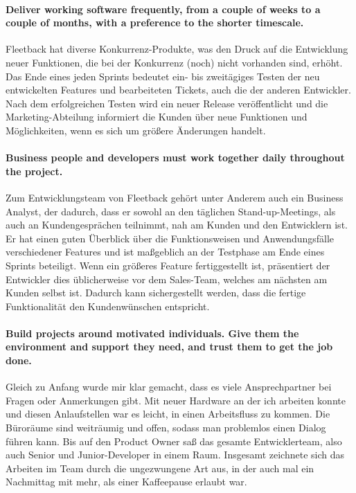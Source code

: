 \documentclass[ngerman]{scrartcl}
\begin{document}
\paragraph{Deliver working software frequently, from a couple of weeks to a couple of months, with a preference to the shorter timescale.}
Fleetback hat diverse Konkurrenz-Produkte, was den Druck auf die Entwicklung neuer Funktionen, die bei der Konkurrenz (noch) nicht vorhanden sind, erhöht. Das Ende eines jeden Sprints bedeutet ein- bis zweitägiges Testen der neu entwickelten Features und bearbeiteten Tickets, auch die der anderen Entwickler. Nach dem erfolgreichen Testen wird ein neuer Release veröffentlicht und die Marketing-Abteilung informiert die Kunden über neue Funktionen und Möglichkeiten, wenn es sich um größere Änderungen handelt.

\paragraph{Business people and developers must work together daily throughout the project.}
Zum Entwicklungsteam von Fleetback gehört unter Anderem auch ein Business Analyst, der dadurch, dass er sowohl an den täglichen Stand-up-Meetings, als auch an Kundengesprächen teilnimmt, nah am Kunden und den Entwicklern ist. Er hat einen guten Überblick über die Funktionsweisen und Anwendungsfälle verschiedener Features und ist maßgeblich an der Testphase am Ende eines Sprints beteiligt. Wenn ein größeres Feature fertiggestellt ist, präsentiert der Entwickler dies üblicherweise vor dem Sales-Team, welches am nächsten am Kunden selbst ist. Dadurch kann sichergestellt werden, dass die fertige Funktionalität den Kundenwünschen entspricht.

\paragraph{Build projects around motivated individuals. Give them the environment and support they need, and trust them to get the job done.}
Gleich zu Anfang wurde mir klar gemacht, dass es viele Ansprechpartner bei Fragen oder Anmerkungen gibt. Mit neuer Hardware an der ich arbeiten konnte und diesen Anlaufstellen war es leicht, in einen Arbeitsfluss zu kommen. Die Büroräume sind weiträumig und offen, sodass man problemlos einen Dialog führen kann. Bis auf den Product Owner saß das gesamte Entwicklerteam, also auch Senior und Junior-Developer in einem Raum. Insgesamt zeichnete sich das Arbeiten im Team durch die ungezwungene Art aus, in der auch mal ein Nachmittag mit mehr, als einer Kaffeepause erlaubt war. 
\end{document}
